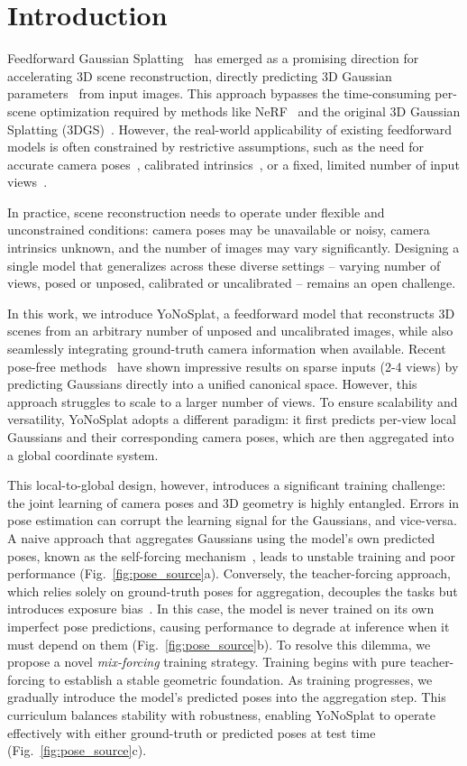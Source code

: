 \section{Introduction}
Feedforward Gaussian Splatting~\citep{pixelsplat,gslrm} has emerged as a promising direction for accelerating 3D scene reconstruction, directly predicting 3D Gaussian parameters~\citep{3dgs} from input images. This approach bypasses the time-consuming per-scene optimization required by methods like NeRF~\citep{nerf} and the original 3D Gaussian Splatting (3DGS)~\citep{3dgs}. However, the real-world applicability of existing feedforward models is often constrained by restrictive assumptions, such as the need for accurate camera poses~\citep{pixelsplat, depthsplat}, calibrated intrinsics~\citep{noposplat, flare}, or a fixed, limited number of input views~\citep{noposplat, mvsplat}.

In practice, scene reconstruction needs to operate under flexible and unconstrained conditions: camera poses may be unavailable or noisy, camera intrinsics unknown, and the number of images may vary significantly. Designing a single model that generalizes across these diverse settings -- varying number of views, posed or unposed, calibrated or uncalibrated -- remains an open challenge.

In this work, we introduce YoNoSplat, a feedforward model that reconstructs 3D scenes from an arbitrary number of unposed and uncalibrated images, while also seamlessly integrating ground-truth camera information when available. Recent pose-free methods~\citep{noposplat, splatt3r} have shown impressive results on sparse inputs (2-4 views) by predicting Gaussians directly into a unified canonical space. However, this approach struggles to scale to a larger number of views. To ensure scalability and versatility, YoNoSplat adopts a different paradigm: it first predicts per-view local Gaussians and their corresponding camera poses, which are then aggregated into a global coordinate system.

This local-to-global design, however, introduces a significant training challenge: the joint learning of camera poses and 3D geometry is highly entangled. Errors in pose estimation can corrupt the learning signal for the Gaussians, and vice-versa. 
A naive approach that aggregates Gaussians using the model’s own predicted poses, known as the self-forcing mechanism~\citep{self-forcing}, leads to unstable training and poor performance (Fig.~\ref{fig:pose_source}a). Conversely, the teacher-forcing approach, which relies solely on ground-truth poses for aggregation, decouples the tasks but introduces exposure bias~\citep{exposure-bias}. In this case, the model is never trained on its own imperfect pose predictions, causing performance to degrade at inference when it must depend on them (Fig.~\ref{fig:pose_source}b).
To resolve this dilemma, we propose a novel \emph{mix-forcing} training strategy. Training begins with pure teacher-forcing to establish a stable geometric foundation. As training progresses, we gradually introduce the model's predicted poses into the aggregation step. This curriculum balances stability with robustness, enabling YoNoSplat to operate effectively with either ground-truth or predicted poses at test time (Fig.~\ref{fig:pose_source}c).

